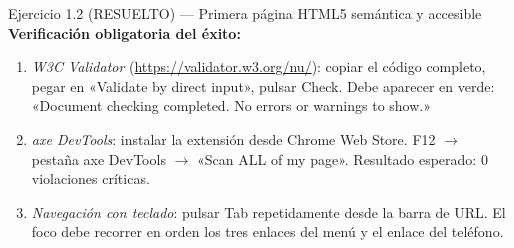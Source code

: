 \documentclass[11pt,a4paper,openany]{book}
\begin{document}
\begin{cajaejercicio}{Ejercicio 1.2 (RESUELTO) --- Primera página HTML5 semántica y accesible}
\textbf{Verificación obligatoria del éxito:}
\begin{enumerate}
\item \emph{W3C Validator} (\url{https://validator.w3.org/nu/}):
copiar el código completo, pegar en «Validate by direct input»,
pulsar Check. Debe aparecer en verde: «Document checking completed.
No errors or warnings to show.»
\item \emph{axe DevTools}: instalar la extensión desde Chrome Web
Store. F12 $\to$ pestaña axe DevTools $\to$ «Scan ALL of my page».
Resultado esperado: 0 violaciones críticas.
\item \emph{Navegación con teclado}: pulsar Tab repetidamente desde
la barra de URL. El foco debe recorrer en orden los tres enlaces del
menú y el enlace del teléfono.
\end{enumerate}
\end{cajaejercicio}
\end{document}
